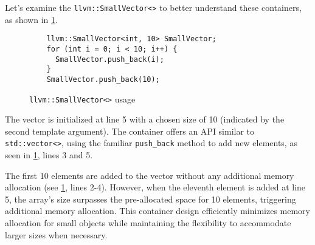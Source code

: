 Let's examine the \texttt{llvm::SmallVector<>} to better understand
these containers, as shown in \cref{lis:ch4:smallvector}.  
\begin{figure}[H]
  \begin{verbatim}
    llvm::SmallVector<int, 10> SmallVector;
    for (int i = 0; i < 10; i++) {
      SmallVector.push_back(i);
    }
    SmallVector.push_back(10);
  \end{verbatim}
\caption{\texttt{llvm::SmallVector<>} usage}
\label{lis:ch4:smallvector}
\end{figure}

The vector is initialized at line 5 with a chosen size of 10 (indicated by the
second template argument). The container offers an API similar to
\texttt{std::vector<>}, using the familiar \texttt{push_back}
method to add new elements, as seen in \cref{lis:ch4:smallvector}, lines 3 and
5. 

The first 10 elements are added to the vector without any additional memory
allocation (see \cref{lis:ch4:smallvector}, lines 2-4). However, when the
eleventh element is added at line 5, the array's size surpasses the
pre-allocated space for 10 elements, triggering additional memory
allocation. This container design efficiently minimizes memory allocation for
small objects while maintaining the flexibility to accommodate larger sizes when
necessary. 

